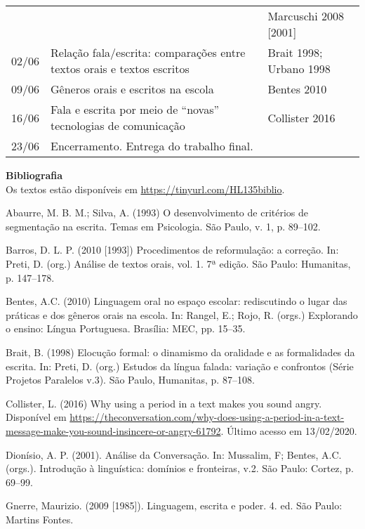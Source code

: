 \documentclass[a4paper,12pt]{article}
\newcommand{\n}{\noindent}
\begin{document}
{\begin{center}
\begin{tabular}{rp{9cm}p{5cm}}
& & Marcuschi 2008 [2001] \\ 
\rowcolor[gray]{0.9}02/06 & Relação fala/escrita: comparações entre textos orais e textos escritos & Brait 1998; Urbano 1998 \\ 
09/06 & Gêneros orais e escritos na escola & Bentes 2010\\
\rowcolor[gray]{0.9}16/06 & Fala e escrita por meio de ``novas'' tecnologias de comunicação & Collister 2016 \\
23/06 & Encerramento. Entrega do trabalho final. &  \\ \hline
\end{tabular}

\end{center}

\bigskip

\n \textbf{Bibliografia} \bigskip \singlespacing\\
\n Os textos estão disponíveis em \url{https://tinyurl.com/HL135biblio}.\\

 \begin{hangparas}{.25in}{1}
\n Abaurre, M. B. M.; Silva, A. (1993) O desenvolvimento de critérios de segmentação na escrita. Temas em Psicologia. São Paulo, v. 1, p. 89--102.

\n Barros, D. L. P. (2010 [1993]) Procedimentos de reformulação: a correção. In: Preti, D. (org.) Análise de textos orais, vol. 1. 7ª edição. São Paulo: Humanitas, p. 147--178. 

\n Bentes, A.C. (2010) Linguagem oral no espaço escolar: rediscutindo o lugar das práticas e dos gêneros orais na escola. In: Rangel, E.; Rojo, R. (orgs.) Explorando o ensino: Língua Portuguesa. Brasília: MEC, pp. 15--35. 

\n Brait, B. (1998) Elocução formal: o dinamismo da oralidade e as formalidades da escrita. In: Preti, D. (org.) Estudos da língua falada: variação e confrontos (Série Projetos Paralelos v.3). São Paulo, Humanitas, p. 87--108.

\n Collister, L. (2016) Why using a period in a text makes you sound angry. Disponível em \url{https://theconversation.com/why-does-using-a-period-in-a-text-message-make-you-sound-insincere-or-angry-61792}. Último acesso em 13/02/2020.

\n Dionísio, A. P. (2001). Análise da Conversação. In: Mussalim, F; Bentes, A.C. (orgs.). Introdução à linguística: domínios e fronteiras, v.2. São Paulo: Cortez, p. 69--99. 

Gnerre, Maurizio. (2009 [1985]). Linguagem, escrita e poder. 4. ed. São Paulo: Martins Fontes.


\end{hangparas}}
\end{document}
